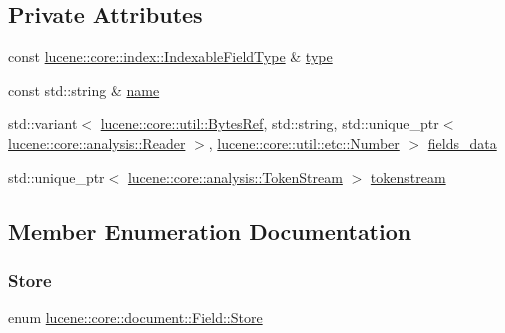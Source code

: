 \subsection*{Private Attributes}
\begin{DoxyCompactItemize}
\item 
const \mbox{\hyperlink{classlucene_1_1core_1_1index_1_1IndexableFieldType}{lucene\+::core\+::index\+::\+Indexable\+Field\+Type}} \& \mbox{\hyperlink{classlucene_1_1core_1_1document_1_1Field_ad627895c156c58f9bd409caf06edbdf4}{type}}
\item 
const std\+::string \& \mbox{\hyperlink{classlucene_1_1core_1_1document_1_1Field_a550ee69f8cb7db2a00f3e9bda4964dfb}{name}}
\item 
std\+::variant$<$ \mbox{\hyperlink{classlucene_1_1core_1_1util_1_1BytesRef}{lucene\+::core\+::util\+::\+Bytes\+Ref}}, std\+::string, std\+::unique\+\_\+ptr$<$ \mbox{\hyperlink{classlucene_1_1core_1_1analysis_1_1Reader}{lucene\+::core\+::analysis\+::\+Reader}} $>$, \mbox{\hyperlink{classlucene_1_1core_1_1util_1_1etc_1_1Number}{lucene\+::core\+::util\+::etc\+::\+Number}} $>$ \mbox{\hyperlink{classlucene_1_1core_1_1document_1_1Field_a745c27d038375a7fd986488a88b44443}{fields\+\_\+data}}
\item 
std\+::unique\+\_\+ptr$<$ \mbox{\hyperlink{classlucene_1_1core_1_1analysis_1_1TokenStream}{lucene\+::core\+::analysis\+::\+Token\+Stream}} $>$ \mbox{\hyperlink{classlucene_1_1core_1_1document_1_1Field_a9ae72843cbdd8524362f65ee9f2c7355}{tokenstream}}
\end{DoxyCompactItemize}


\subsection{Member Enumeration Documentation}
\mbox{\label{classlucene_1_1core_1_1document_1_1Field_a7d5d79f0c56d3548ab8d46d0e7dae35d}} 
\subsubsection{\texorpdfstring{Store}{Store}}
{\footnotesize\ttfamily enum \mbox{\hyperlink{classlucene_1_1core_1_1document_1_1Field_a7d5d79f0c56d3548ab8d46d0e7dae35d}{lucene\+::core\+::document\+::\+Field\+::\+Store}}\hspace{0.3cm}{\ttfamily [strong]}}


